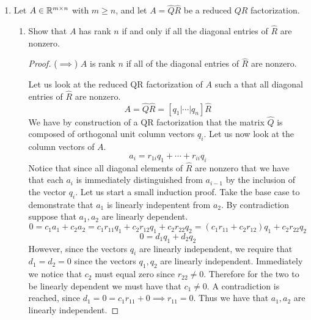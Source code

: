\documentclass{article}
\begin{document}
\begin{enumerate}
\item   %
Let $A \in \mathbb{R}^{m \times n}$ with $m \ge n$, and let $A = \hat{Q}\hat{R}$ be a reduced $QR$ factorization. 

\begin{enumerate}
\item Show that $A$ has rank $n$ if and only if all the diagonal entries of $\hat{R}$ are nonzero.
    
\begin{proof}
    
    ($\implies$) $A$ is rank $n$ if all of the diagonal entries of $\hat{R}$ are nonzero. 
    
    Let us look at the reduced QR factorization of $A$ such a that all diagonal entries of $\hat{R}$ are nonzero. 
    \[
        A = \hat{Q}\hat{R} = \left[q_1 \Big| \cdots \Big| q_n\right]\hat{R}
    \]
    We have by construction of a QR factorization that the matrix $\hat{Q}$ is composed of orthogonal unit column vectors $q_i$. Let us now look at the column vectors of $A$. 
    \[
        a_i = r_{1i}q_1 + \cdots + r_{ii}q_i
    \]
    Notice that since all diagonal elements of $\hat{R}$ are nonzero that we have that each $a_i$ is immediately distinguished from $a_{i-1}$ by the inclusion of the vector $q_i$. Let us start a small induction proof. Take the base case to demonstrate that $a_1$ is linearly indepentent from $a_2$. By contradiction suppose that $a_1, a_2$ are linearly dependent. 
    \[
        0 = c_1a_1 + c_2a_2 = c_{1}r_{11}q_1 + c_2r_{12}q_1 + c_2r_{22}q_2 = (c_1r_11 + c_2r_{12})q_1 + c_2r_{22}q_2
    \]
    \[
        0 = d_1q_1 + d_2q_2
    \]
    However, since the vectors $q_i$ are linearly independent, we require that $d_1 = d_2 = 0$ since the vectors $q_1, q_2$ are linearly independent. Immediately we notice that $c_2$ must equal zero since $r_{22} \neq 0$. Therefore for the two to be linearly dependent we must have that $c_1 \neq 0$. A contradiction is reached, since $d_1 = 0 = c_1r_{11} + 0 \implies r_{11} = 0$. Thus we have that $a_1, a_2$ are linearly independent. 
    

\end{proof}
\end{enumerate}
\end{enumerate}
\end{document}
